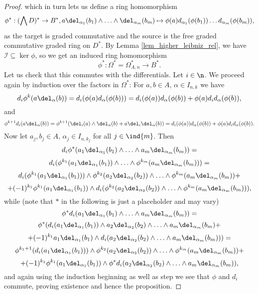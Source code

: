 \begin{prop}
\begin{proof}
which in turn lets us define a ring homomorphism
    \[ \phi ^*: (\bigwedge D)^* \to B^*, %
    a \del_{\alpha_1} (b_1) \wedge \ldots \wedge \del_{\alpha_m} (b_m) \mapsto%
    \phi(a) d_{\alpha_1} (\phi(b_1)) \ldots d_{\alpha_m} (\phi(b_m)), \]
as the target is graded commutative and the source is the free graded commutative graded ring on $D^*$.
By Lemma \ref{lem_higher_leibniz_rel}, we have $\mathcal{I} \subseteq \ker \phi$, so we get an induced ring homomorphism%
\[\phi^*: \Omega^* = \Omega^*_{A,n} \to B^*.\]
Let us check that this commutes with the differentials. Let $i \in \n$. We proceed again by induction over the factors in $\Omega^*$: For $a,b \in A$, $\alpha \in I_{n,k}$ we have
    \[ d_i \phi^k ( a \del_\alpha (b) ) = d_i (\phi(a) d_\alpha(\phi(b)) ) = %
    d_i (\phi(a)) d_\alpha(\phi(b)) + \phi(a) d_i d_\alpha (\phi(b)), \]
and
    \[ \phi^{k+1} d_i (a \del_\alpha (b)) = %
    \phi^{k+1} (\del_i (a) \wedge \del_\alpha (b) + a \del_i \del_\alpha (b) ) = %
    d_i (\phi(a)) d_\alpha(\phi(b)) + \phi(a) d_i d_\alpha (\phi(b)). \]
Now let $a_j, b_j \in A$, $\alpha_j \in I_{n,k_j}$ for all $j \in \ind{m}$.%
Then%
    \[ d_i \phi^* ( a_1 \del_{\alpha_1} (b_1) \wedge \ldots \wedge %
    a_m \del_{\alpha_m} (b_m) ) = \]%
    \[d_i ( \phi^{k_1}( a_1 \del_{\alpha_1} (b_1) ) \wedge \ldots \wedge %
    \phi^{k_m} ( a_m \del_{\alpha_m} (b_m) ) ) = \]%
    \[d_i ( \phi^{k_1}( a_1 \del_{\alpha_1} (b_1) ) ) \wedge %
    \phi^{k_2}( a_2 \del_{\alpha_2} (b_2) ) \wedge \ldots \wedge %
    \phi^{k_m}( a_m \del_{\alpha_m} (b_m) ) + \]%
    \[ + (-1)^{k_1} \phi^{k_1}( a_1 \del_{\alpha_1} (b_1) ) \wedge %
    d_i ( \phi^{k_2}( a_2 \del_{\alpha_2} (b_2) ) \wedge \ldots \wedge %
    \phi^{k_m}( a_m \del_{\alpha_m} (b_m) ) ),
    \]
while (note that $*$ in the following is just a placeholder and may vary)
    \[
    \phi^{*} d_i ( a_1 \del_{\alpha_1} (b_1) \wedge \ldots \wedge %
    a_m \del_{\alpha_m} (b_m) ) = \]%
    \[ \phi^{*} ( d_i ( a_1 \del_{\alpha_1} (b_1) ) \wedge a_2 \del_{\alpha_2} (b_2) \wedge \ldots \wedge a_m \del_{\alpha_m} (b_m) + \]%
    \[ + (-1)^{k_1} a_1 \del_{\alpha_1} (b_1) \wedge d_i (a_2 \del_{\alpha_2} (b_2) %
    \wedge \ldots \wedge a_m \del_{\alpha_m} (b_m)) ) = \]%
    \[\phi^{k_1+1} (d_i ( a_1 \del_{\alpha_1} (b_1) ) ) \wedge %
    \phi^{k_2}( a_2 \del_{\alpha_2} (b_2) ) \wedge \ldots \wedge %
    \phi^{k_m}( a_m \del_{\alpha_m} (b_m) ) + \]%
    \[ + (-1)^{k_1} \phi^{k_1}( a_1 \del_{\alpha_1} (b_1) ) \wedge \phi^* d_i (a_2 \del_{\alpha_2} (b_2) \wedge \ldots \wedge a_m \del_{\alpha_m} (b_m)), \]
and again using the induction beginning as well as step we see that $\phi$ and $d_i$ commute, proving existence and hence the proposition.
\end{proof}
\end{prop}
